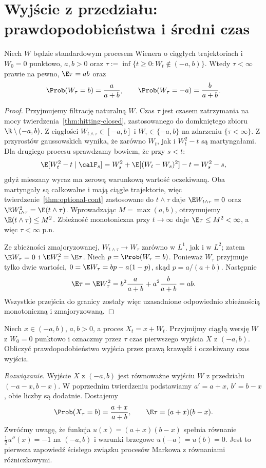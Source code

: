\section{Wyjście z przedziału: prawdopodobieństwa i średni czas}
\begin{twierdzenie}
Niech $W$ będzie standardowym procesem Wienera
o ciągłych trajektoriach i $W_0=0$ punktowo,
$a,b>0$ oraz
$\tau:=\inf\{t\ge0:W_t\notin(-a,b)\}$.
Wtedy $\tau<\infty$ prawie na pewno,
$\E\tau=ab$ oraz
\[
\Prob(W_\tau=b)=\frac{a}{a+b},\qquad
\Prob(W_\tau=-a)=\frac{b}{a+b}.
\]
\end{twierdzenie}
\begin{proof}
Przyjmujemy filtrację naturalną $W$.
Czas $\tau$ jest czasem zatrzymania na mocy
twierdzenia~\ref{thm:hitting-closed}, zastosowanego
do domkniętego zbioru $\R\setminus(-a,b)$.
Z ciągłości $W_{t\wedge\tau}\in[-a,b]$ i
$W_\tau\in\{-a,b\}$ na zdarzeniu $\{\tau<\infty\}$.
Z przyrostów gaussowskich wynika, że zarówno $W_t$,
jak i $W_t^2-t$ są martyngałami. Dla drugiego procesu
sprawdzamy bowiem, że przy $s<t$:
\[
\E[W_t^2-t\mid\calF_s]
=W_s^2+\E[(W_t-W_s)^2]-t=W_s^2-s,
\]
gdyż mieszany wyraz ma zerową warunkową wartość oczekiwaną.
Oba martyngały są całkowalne i mają ciągłe trajektorie,
więc twierdzenie~\ref{thm:optional-cont} zastosowane
do $t\wedge\tau$ daje
$\E W_{t\wedge\tau}=0$ oraz
$\E W_{t\wedge\tau}^2=\E(t\wedge\tau)$.
Wprowadzając $M=\max(a,b)$, otrzymujemy
$\E(t\wedge\tau)\le M^2$. Zbieżność monotoniczna
przy $t\to\infty$ daje $\E\tau\le M^2<\infty$,
a więc $\tau<\infty$ p.n.

Ze zbieżności zmajoryzowanej,
$W_{t\wedge\tau}\to W_\tau$ zarówno w $L^1$,
jak i w $L^2$; zatem
$\E W_\tau=0$ i
$\E W_\tau^2=\E\tau$.
Niech $p=\Prob(W_\tau=b)$. Ponieważ
$W_\tau$ przyjmuje tylko dwie wartości,
$0=\E W_\tau=bp-a(1-p)$, skąd $p=a/(a+b)$.
Następnie
\[
\E\tau=\E W_\tau^2
=b^2\frac{a}{a+b}+a^2\frac{b}{a+b}=ab.
\]
Wszystkie przejścia do granicy zostały więc uzasadnione
odpowiednio zbieżnością monotoniczną i zmajoryzowaną.
\end{proof}

\begin{zadanie}
Niech $x\in(-a,b)$, $a,b>0$, a proces
$X_t=x+W_t$. Przyjmijmy ciągłą wersję $W$ z $W_0=0$
punktowo i oznaczmy przez $\tau$ czas pierwszego
wyjścia $X$ z $(-a,b)$. Obliczyć prawdopodobieństwo wyjścia
przez prawą krawędź i oczekiwany czas wyjścia.

\emph{Rozwiązanie.} Wyjście $X$ z $(-a,b)$ jest
równoważne wyjściu $W$ z przedziału
$(-a-x,b-x)$. W poprzednim twierdzeniu podstawiamy
$a'=a+x$, $b'=b-x$, obie liczby są dodatnie. Dostajemy
\[
\Prob(X_\tau=b)=\frac{a+x}{a+b},\qquad
\E\tau=(a+x)(b-x).
\]
Zwróćmy uwagę, że funkcja $u(x)=(a+x)(b-x)$
spełnia równanie $\frac12u''(x)=-1$ na $(-a,b)$
i warunki brzegowe $u(-a)=u(b)=0$.
Jest to pierwsza zapowiedź ścisłego związku procesów
Markowa z równaniami różniczkowymi.
\end{zadanie}

